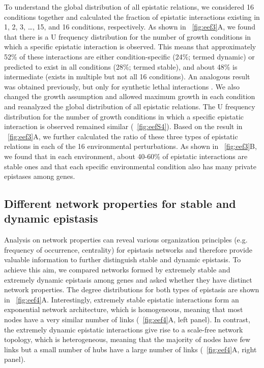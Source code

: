 To understand the global distribution of all epistatic relations, we
considered 16 conditions together and calculated the fraction of
epistatic interactions existing in 1, 2, 3, \ldots, 15, and 16
conditions, respectively. As shown in \Fig~\ref{fig:eef3}A, we found that there is a
U frequency distribution for the number of growth conditions in which
a specific epistatic interaction is observed. This means that
approximately 52\% of these interactions are either condition-specific
(24\%; termed dynamic) or predicted to exist in all conditions (28\%;
termed stable), and about 48\% is intermediate (exists in multiple but not
all 16 conditions). An analogous result was obtained previously, but
only for synthetic lethal interactions \citep{Harrison2007}. We also changed the
growth assumption and allowed maximum growth in each condition and
reanalyzed the global distribution of all epistatic relations. The U
frequency distribution for the number of growth conditions in which a
specific epistatic interaction is observed remained similar
(\Fig~\ref{fig:eefS4}). Based on the result in \Fig~\ref{fig:eef3}A,
we further calculated the ratio of these three types of epistatic
relations in each of the 16 environmental perturbations. As shown in
\Fig~\ref{fig:eef3}B, we found that in
each environment, about 40-60\% of epistatic interactions are stable ones
and that each specific environmental condition also has many private
epistases among genes.


\subsection{Different network properties for stable and dynamic epistasis}

Analysis on network properties can reveal various organization
principles (e.g. frequency of occurrence, centrality) for epistasis
networks \citep{Tong2004, Costanzo2010} and therefore provide valuable
information to further
distinguish stable and dynamic epistasis. To achieve this aim, we
compared networks formed by extremely stable and extremely dynamic
epistasis among genes and asked whether they have distinct network
properties. The degree distributions for both types of epistasis are
shown in \Fig~\ref{fig:eef4}A. Interestingly, extremely stable epistatic
interactions form an exponential network architecture, which is
homogeneous, meaning that most nodes have a very similar number of
links (\Fig~\ref{fig:eef4}A, left panel). In contrast, the extremely dynamic
epistatic interactions give rise to a scale-free network topology,
which is heterogeneous, meaning that the majority of nodes have few
links but a small number of hubs have a large number of links
(\Fig~\ref{fig:eef4}A, right panel).

